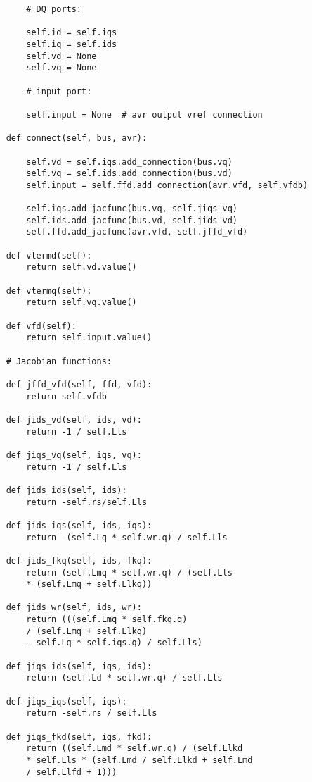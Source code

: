 \begin{lstlisting}
        # DQ ports:
        
        self.id = self.iqs
        self.iq = self.ids
        self.vd = None
        self.vq = None
        
        # input port:
        
        self.input = None  # avr output vref connection 
    
    def connect(self, bus, avr):
    
        self.vd = self.iqs.add_connection(bus.vq)
        self.vq = self.ids.add_connection(bus.vd)
        self.input = self.ffd.add_connection(avr.vfd, self.vfdb)
        
        self.iqs.add_jacfunc(bus.vq, self.jiqs_vq)
        self.ids.add_jacfunc(bus.vd, self.jids_vd)
        self.ffd.add_jacfunc(avr.vfd, self.jffd_vfd)
    
    def vtermd(self):
        return self.vd.value()
    
    def vtermq(self):
        return self.vq.value()
    
    def vfd(self):
        return self.input.value()
    
    # Jacobian functions:
    
    def jffd_vfd(self, ffd, vfd):
        return self.vfdb
        
    def jids_vd(self, ids, vd):
        return -1 / self.Lls
        
    def jiqs_vq(self, iqs, vq):
        return -1 / self.Lls
        
    def jids_ids(self, ids):
        return -self.rs/self.Lls
        
    def jids_iqs(self, ids, iqs):
        return -(self.Lq * self.wr.q) / self.Lls
        
    def jids_fkq(self, ids, fkq):
        return (self.Lmq * self.wr.q) / (self.Lls
        * (self.Lmq + self.Llkq))
        
    def jids_wr(self, ids, wr):
        return (((self.Lmq * self.fkq.q)
        / (self.Lmq + self.Llkq)
        - self.Lq * self.iqs.q) / self.Lls)
        
    def jiqs_ids(self, iqs, ids):
        return (self.Ld * self.wr.q) / self.Lls
        
    def jiqs_iqs(self, iqs):
        return -self.rs / self.Lls
        
    def jiqs_fkd(self, iqs, fkd):
        return ((self.Lmd * self.wr.q) / (self.Llkd 
        * self.Lls * (self.Lmd / self.Llkd + self.Lmd
        / self.Llfd + 1)))
        

\end{lstlisting}

